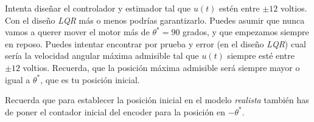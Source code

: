 \documentclass[11pt,a4paper,titlepage]{article}
\begin{document}
	Intenta diseñar el controlador y estimador tal que $u(t)$ estén entre $\pm 12$ voltios. Con el diseño \emph{LQR} más o menos podrías garantizarlo. Puedes asumir que nunca vamos a querer mover el motor más de $\theta^* = 90$ grados, y que empezamos siempre en reposo. Puedes intentar encontrar por prueba y error (en el diseño \emph{LQR}) cual sería la velocidad angular máxima admisible tal que $u(t)$ siempre esté entre $\pm 12$ voltios. Recuerda, que la posición máxima admisible será siempre mayor o igual a $\theta^*$, que es tu posición inicial.

	Recuerda que para establecer la posición inicial en el modelo \emph{realista} también has de poner el contador inicial del encoder para la posición en $-\theta^*$.
\end{document}

